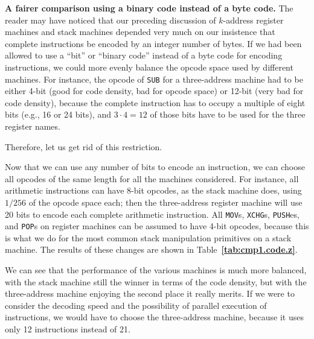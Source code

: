 \documentclass[12pt,oneside]{article}
\def\makepoint#1{\medbreak\noindent{\bf #1.\ }}
\def\nxsubpoint{\refstepcounter{subsubsection}%
    \smallbreak\makepoint{\thesubsubsection}}
\def\refpoint#1{{\rm\textbf{\ref{#1}}}}
\let\ptref=\refpoint
\def\emb#1{\textbf{#1.}}
\begin{document}
\nxsubpoint\label{sp:cmp1.fair}
\emb{A fairer comparison using a binary code instead of a byte code}
The reader may have noticed that our preceding discussion of $k$-address register machines and stack machines depended very much on our insistence that complete instructions be encoded by an integer number of bytes. If we had been allowed to use a ``bit'' or ``binary code'' instead of a byte code for encoding instructions, we could more evenly balance the opcode space used by different machines. For instance, the opcode of {\tt SUB} for a three-address machine had to be either 4-bit (good for code density, bad for opcode space) or 12-bit (very bad for code density), because the complete instruction has to occupy a multiple of eight bits (e.g., 16 or 24 bits), and $3\cdot 4=12$ of those bits have to be used for the three register names.

Therefore, let us get rid of this restriction.

Now that we can use any number of bits to encode an instruction, we can choose all opcodes of the same length for all the machines considered. For instance, all arithmetic instructions can have 8-bit opcodes, as the stack machine does, using $1/256$ of the opcode space each; then the three-address register machine will use 20 bits to encode each complete arithmetic instruction. All {\tt MOV}s, {\tt XCHG}s, {\tt PUSH}es, and {\tt POP}s on register machines can be assumed to have 4-bit opcodes, because this is what we do for the most common stack manipulation primitives on a stack machine. The results of these changes are shown in Table~\ptref{tab:cmp1.code.z}.

We can see that the performance of the various machines is much more balanced, with the stack machine still the winner in terms of the code density, but with the three-address machine enjoying the second place it really merits. If we were to consider the decoding speed and the possibility of parallel execution of instructions, we would have to choose the three-address machine, because it uses only 12 instructions instead of 21.
\end{document}
